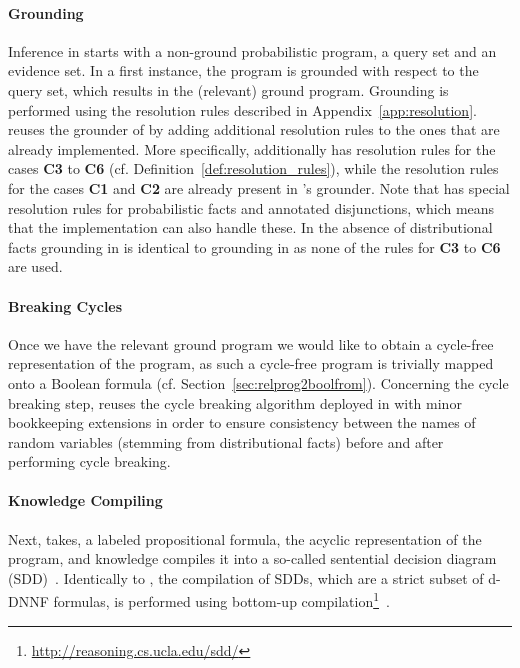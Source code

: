 \paragraph{\bf Grounding}
Inference in \dcproblogsys starts with a non-ground probabilistic program, a query set and an evidence set. In a first instance, the program is grounded with respect to the query set, which results in the (relevant) ground program. Grounding is performed using the resolution rules described in Appendix~\ref{app:resolution}.
\dcproblogsys reuses the grounder of \problogsys by adding additional resolution rules to the ones that are already implemented. More specifically, \dcproblogsys additionally has resolution rules for the cases {\bf C3} to {\bf C6} (cf. Definition~\ref{def:resolution_rules}), while the resolution rules for the cases {\bf C1} and {\bf C2} are already present in \problogsys's grounder. Note that \problogsys has special resolution rules for probabilistic facts and annotated disjunctions, which means that the \dcproblogsys implementation can also handle these. In the absence of distributional facts grounding in \dcproblogsys is identical to grounding in \problogsys as none of the rules for {\bf C3} to {\bf C6} are used. 




\paragraph{\bf Breaking Cycles}
Once we have the relevant ground program we would like to obtain a cycle-free representation of the program, as such a cycle-free program is trivially mapped onto a Boolean formula (cf. Section~\ref{sec:relprog2boolfrom}). Concerning the cycle breaking step, \dcproblogsys reuses the cycle breaking algorithm deployed in \problogsys with minor bookkeeping extensions in order to ensure consistency between the names of random variables (stemming from distributional facts) before and after performing cycle breaking.  




\paragraph{\bf Knowledge Compiling}
Next, \dcproblogsys takes, a labeled propositional formula, \ie the acyclic representation of the program, and knowledge compiles it into a so-called sentential decision diagram (SDD)~\citep{darwiche2011sdd}.
Identically to \problogsys, the compilation of SDDs, which are a strict subset of d-DNNF formulas, is performed using bottom-up compilation\footnote{\url{http://reasoning.cs.ucla.edu/sdd/}}~\citep{choi2013dynamic}.

